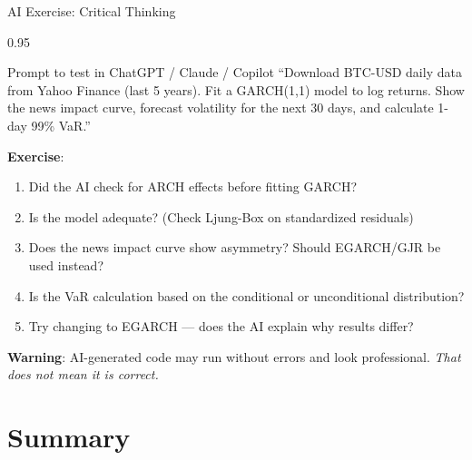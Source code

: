 \documentclass[9pt, aspectratio=169, t]{beamer}
\begin{document}
\begin{frame}{AI Exercise: Critical Thinking}
    \begin{cminipage}{0.95\textwidth}
    \vspace{-0.3cm}
    \begin{block}{\footnotesize Prompt to test in ChatGPT / Claude / Copilot}
        {\footnotesize
        ``Download BTC-USD daily data from Yahoo Finance (last 5 years). Fit a GARCH(1,1) model to log returns. Show the news impact curve, forecast volatility for the next 30 days, and calculate 1-day 99\% VaR.''
        }
    \end{block}
    \vspace{-2mm}
    {\footnotesize
    \textbf{Exercise}:
    \begin{enumerate}\setlength{\itemsep}{0pt}
        \item Did the AI check for ARCH effects before fitting GARCH?
        \item Is the model adequate? (Check Ljung-Box on standardized residuals)
        \item Does the news impact curve show asymmetry? Should EGARCH/GJR be used instead?
        \item Is the VaR calculation based on the conditional or unconditional distribution?
        \item Try changing to EGARCH --- does the AI explain why results differ?
    \end{enumerate}
    }
    \vspace{-2mm}
    \begin{alertblock}{}
        {\footnotesize \textbf{Warning}: AI-generated code may run without errors and look professional. \textit{That does not mean it is correct.}}
    \end{alertblock}
    \end{cminipage}
\end{frame}

\section{Summary}
\end{document}
